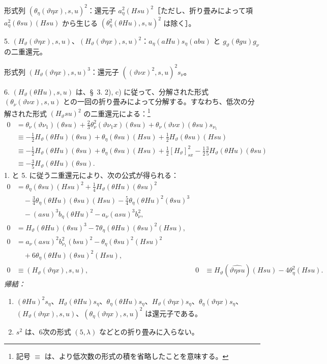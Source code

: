 \documentclass[11pt]{article}
\begin{document}
形式列 $(\theta_\eta(\vartheta\eta x),s,u)^2$：還元子 $a_\eta^2(Hsu)^2$［ただし、折り畳みによって項 $a_\eta^2(\theta su)(Hsu)$ から生じる $(\theta_\eta^2(\theta Hu),s,u)^2$ は除く］。

5. $(H_\vartheta(\vartheta\eta x),s,u)$、$(H_\vartheta(\vartheta\eta x),s,u)^2$：$a_\eta(aHu)s_\eta(abu)$ と $g_\vartheta(\theta gu)g_\nu$ の二重還元。

形式列 $(H_\vartheta(\vartheta\eta x),s,u)^3$：還元子 $((\vartheta\nu x)^2,s,u)^2s_\nu$。

6. $(H_\vartheta(\theta Hu),s,u)$ は、\S\ 3. 2), c) に従って、分解された形式 $(\theta_\nu(\vartheta\nu x),s,u)$ との一回の折り畳みによって分解する。すなわち、低次の分解された形式 $(H_\vartheta su)^2$ の二重還元による：\footnote{記号 $\equiv$ は、より低次数の形式の積を省略したことを意味する。}
\begin{align*}
0&=\theta_\nu(\vartheta\nu_1)(\theta su)+\frac23\theta_\nu^2(\vartheta\nu_1x)(\theta su)+\theta_\nu(\vartheta\nu x)(\theta su)s_{\nu_1}\\
&\equiv -\frac12H_\vartheta(\theta Hu)(\theta su)+\theta_\eta(\theta su)(Hsu)+\frac12H_\vartheta(\theta su)(Hsu)\\
&\equiv -\frac12H_\vartheta(\theta Hu)(\theta su)+\theta_\eta(\theta su)(Hsu)+\frac12[H_\vartheta]_{sx}^2-\frac12\frac35H_\vartheta(\theta Hu)(\theta su)\\
&\equiv -\frac35H_\vartheta(\theta Hu)(\theta su).
\end{align*}
1. と 5. に従う二重還元により、次の公式が得られる：
\begin{equation}
\tag{31}
\begin{aligned}
0&=\theta_\eta(\theta su)(Hsu)^2+\frac14H_\vartheta(\theta Hu)(\theta su)^2\\
&\quad-\frac34\theta_\eta(\theta Hu)(\theta su)(Hsu)-\frac54\theta_\eta(\theta Hu)^2(\theta su)^3\\
&\quad-(asu)^3b_\eta(\theta Hu)^2-a_\nu(asu)^3b_\nu^2,\\
0&=H_\vartheta(\theta Hu)(\theta su)^3-7\theta_\eta(\theta Hu)(\theta su)^2(Hsu),\\
0&=a_\nu(asu)^2b_{\nu_1}^{2}(bsu)^2-\theta_\eta(\theta su)^2(Hsu)^2\\
&\quad+6\theta_\eta(\theta Hu)(\theta su)^2(Hsu),\\
0&\equiv (H_\vartheta(\vartheta\eta x),s,u),
&0&\equiv H_\vartheta(\widehat{\vartheta\eta su})(Hsu)-4\theta_\eta^2(Hsu).
\end{aligned}
\end{equation}
\noindent\emph{帰結：}
\begin{enumerate}
\item $(\theta Hu)^2s_\eta$、$H_\vartheta(\theta Hu)s_\eta$、$\theta_\eta(\theta Hu)s_\eta$、$H_\vartheta(\vartheta\eta x)s_\eta$、$\theta_\eta(\vartheta\eta x)s_\eta$、$(H_\vartheta(\vartheta\eta x),s,u)$、$(\theta_\eta(\vartheta\eta x),s,u)^2$ は還元子である。
\item $s^2$ は、6次の形式 $(5,\lambda)$ などとの折り畳みに入らない。
\end{enumerate}
\end{document}

